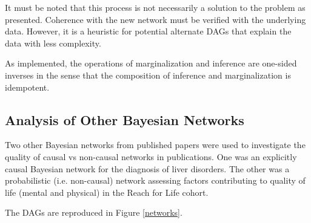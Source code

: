 \documentclass{article}
\begin{document}
	It must be noted that this process is not necessarily a solution to the problem as presented.
	Coherence with the new network must be verified with the underlying data.
	However, it is a heuristic for potential alternate DAGs that explain the data with less complexity.
	
	As implemented, the operations of marginalization and inference are one-sided inverses in the sense that the composition of inference and marginalization is idempotent.
	
	\subsection{Analysis of Other Bayesian Networks}
	
	Two other Bayesian networks from published papers were used to investigate the quality of causal vs non-causal networks in publications.
	One was an explicitly causal Bayesian network for the diagnosis of liver disorders\cite{liverDisorders}.
	The other was a probabilistic (i.e. non-causal) network assessing factors contributing to quality of life (mental and physical) in the Reach for Life cohort\cite{Xu2018}.
	
	The DAGs are reproduced in Figure \ref{networks}.
	
\end{document}
